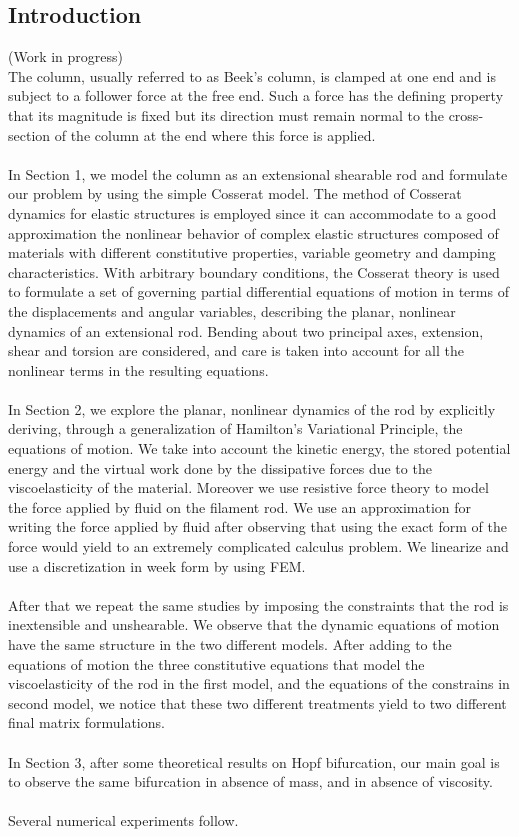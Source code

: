 \documentclass[12pt]{article}
\begin{document}
\begin{center}
\section{Introduction}
(Work in progress)
\\
The column, usually referred to as Beek's column, is clamped at one end and is subject to a follower force at the  free end.
Such a force has the defining property that its magnitude is fixed but its direction must remain normal to the cross-section of the column at the end where this force is applied.
\\\\
In Section 1, we model the column as an extensional shearable rod and formulate our problem by using the simple Cosserat model. 
The method of Cosserat dynamics for elastic structures is employed since it can accommodate to a good approximation the nonlinear behavior of complex elastic structures composed of materials with different constitutive properties, variable geometry and damping characteristics. With arbitrary boundary conditions, the Cosserat theory is used to formulate a set of governing partial differential equations of motion in terms of the displacements and angular variables, describing the planar, nonlinear dynamics of an extensional rod. Bending about two principal axes, extension, shear and torsion are considered, and care is taken into account for all the nonlinear terms in the resulting equations. 
\\\\
In Section 2, we explore the planar, nonlinear dynamics of the rod by explicitly deriving, through a generalization of Hamilton's Variational Principle, the equations of motion. We take into account the kinetic energy, the stored potential energy and the virtual work done by the dissipative forces due to the viscoelasticity of the material. Moreover we use resistive force theory to model the force applied by fluid on the filament rod. We use an approximation for writing the force applied by fluid after observing that using the exact form of the force would yield to an extremely complicated calculus problem. We linearize and use a discretization in week form by using FEM.
\\\\
After that we repeat the same studies by imposing the constraints that the rod is inextensible and unshearable.
We observe that the dynamic equations of motion have the same structure in the two different models. After adding to the equations of motion the three constitutive equations that model the viscoelasticity of the rod in the first model, and the equations of the constrains in second model, we notice that these two different treatments yield to two different final matrix formulations.
\\\\
In Section 3, after some theoretical results on Hopf bifurcation, our main goal is to observe the same bifurcation in absence of mass, and in absence of viscosity.
\\\\
Several numerical experiments follow.



\end{center}
\end{document}
